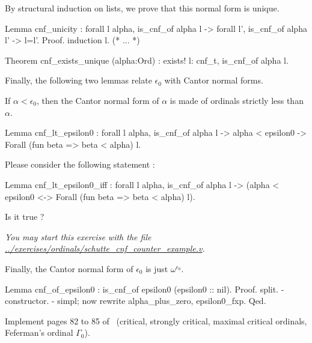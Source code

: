 {By structural induction on lists, we prove that this normal form is unique.

\begin{Coqsrc}
 Lemma cnf_unicity : forall l alpha, 
   is_cnf_of alpha l -> 
   forall l',  is_cnf_of alpha l' -> l=l'.
Proof.
 induction l.
 (*  ...  *)

Theorem cnf_exists_unique (alpha:Ord) :
  exists! l: cnf_t, is_cnf_of alpha l.
\end{Coqsrc}


Finally, the following two lemmas relate  $\epsilon_0$ with Cantor normal forms.

If $\alpha<\epsilon_0$, then the Cantor normal form of $\alpha$ is made of ordinals strictly less than $\alpha$.

\begin{Coqsrc}
Lemma cnf_lt_epsilon0 : 
 forall l alpha, 
   is_cnf_of alpha l ->  alpha < epsilon0 ->
   Forall (fun beta =>  beta < alpha) l.
\end{Coqsrc}


\begin{exercise}
Please consider the following statement :

\begin{Coqsrc}
Lemma cnf_lt_epsilon0_iff : 
 forall l alpha, 
   is_cnf_of alpha l ->  
   (alpha < epsilon0 <->  Forall (fun beta =>  beta < alpha) l).
\end{Coqsrc}

Is it true ?

\emph{You may start this exercise with the file
\url{../exercises/ordinals/schutte_cnf_counter_example.v}.}
\end{exercise}

Finally, the Cantor normal form of $\epsilon_0$ is just $\omega^{\epsilon_0}$.

\begin{Coqsrc}
Lemma cnf_of_epsilon0 : is_cnf_of epsilon0 (epsilon0 :: nil).
Proof.
  split.
  - constructor.  
  - simpl;  now rewrite alpha_plus_zero, epsilon0_fxp.
Qed.
\end{Coqsrc}


\begin{project}
Implement pages 82 to 85 of~\cite{schutte} (critical, strongly critical, maximal critical ordinals, Feferman's ordinal $\Gamma_0$).
\end{project}

}
